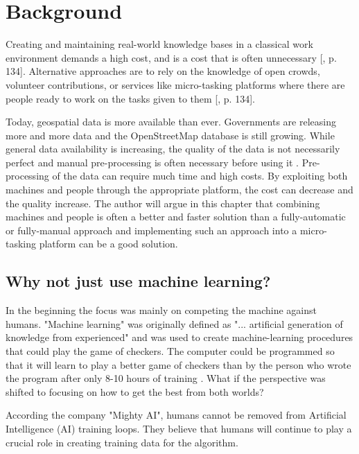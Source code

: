 \chapter{Background}

Creating and maintaining real-world knowledge bases in a classical work environment demands a high cost, and is a cost that is often unnecessary [\citep{Meier2013}, p. 134]. Alternative approaches are to rely on the knowledge of open crowds, volunteer contributions, or services like micro-tasking platforms where there are people ready to work on the tasks given to them [\citep{Meier2013}, p. 134].   

Today, geospatial data is more available than ever. Governments are releasing more and more data and the OpenStreetMap database is still growing. While general data availability is increasing, the quality of the data is not necessarily perfect and manual pre-processing is often necessary before using it \citep{Difallah2015}.  Pre-processing of the data can require much time and high costs. By exploiting both machines and people through the appropriate platform, the cost can decrease and the quality increase. The author will argue in this chapter that combining machines and people is often a better and faster solution than a fully-automatic or fully-manual approach and implementing such an approach into a micro-tasking platform can be a good solution. 

\section{Why not just use machine learning?}
In the beginning the focus was mainly on competing the machine against humans. "Machine learning" was originally defined as "... artificial generation of knowledge from experienced" and was used to create machine-learning procedures that could play the game of checkers. The computer could be programmed so that it will learn to play a better game of checkers than by the person who wrote the program after only 8-10 hours of training \citep{Samuel1959}. What if the perspective was shifted to focusing on how to get the best from both worlds? 

According the company "Mighty AI", humans cannot be removed from Artificial Intelligence (AI) training loops. They believe that humans will continue to play a crucial role in creating training data for the algorithm. %


